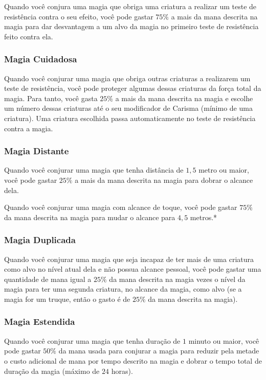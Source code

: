 \documentclass{RPG_Adventure}[2021/10/20]
\begin{document}
\begin{multicols}{2}
Quando você conjura uma magia que obriga uma criatura a realizar um teste de
resistência contra o seu efeito, você pode gastar $75\%$ a mais da mana descrita
na magia para dar desvantagem a um alvo da magia no primeiro teste de
resistência feito contra ela.

\subsubsection*{Magia Cuidadosa}%

Quando você conjurar uma magia que obriga outras criaturas a realizarem um teste
de resistência, você pode proteger algumas dessas criaturas da força total da
magia. Para tanto, você gasta $25\%$ a mais da mana descrita na magia e escolhe
um número dessas criaturas até o seu modificador de Carisma (mínimo de uma
criatura). Uma criatura escolhida passa automaticamente no teste de resistência
contra a magia.

\subsubsection*{Magia Distante}%

Quando você conjurar uma magia que tenha distância de $1,5$ metro ou maior, você
pode gastar $25\%$ a mais da mana descrita na magia para dobrar o alcance dela.

Quando você conjurar uma magia com alcance de toque, você pode gastar $75\%$ da
mana descrita na magia para mudar o alcance para $4,5$ metros.*

\subsubsection*{Magia Duplicada}%

Quando você conjurar uma magia que seja incapaz de ter mais de uma criatura como
alvo no nível atual dela e não possua alcance pessoal, você pode gastar uma
quantidade de mana igual a $25\%$ da mana descrita na magia vezes o nível da
magia para ter uma segunda criatura, no alcance da magia, como alvo (se a magia
for um truque, então o gasto é de $25\%$ da mana descrita na magia).

\subsubsection{Magia Estendida}%

Quando você conjurar uma magia que tenha duração de $1$ minuto ou maior, você
pode gastar $50\%$ da mana usada para conjurar a magia para reduzir pela metade o
custo adicional de mana por tempo descrito na magia e dobrar o tempo total de
duração da magia (máximo de $24$ horas).


\end{multicols}
\end{document}
